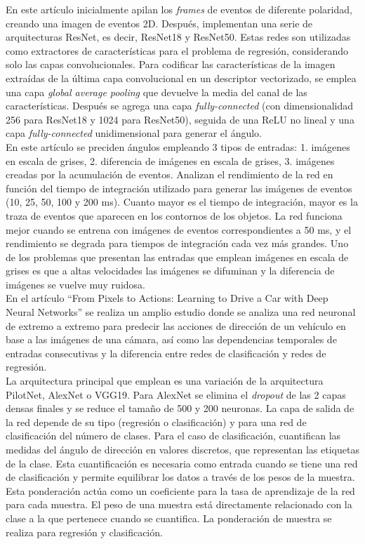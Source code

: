 En este artículo inicialmente apilan los \textit{frames} de eventos de diferente polaridad, creando una imagen de eventos 2D. Después, implementan una serie de arquitecturas ResNet, es decir, ResNet18 y ResNet50. Estas redes son utilizadas como extractores de características para el problema de regresión, considerando solo las capas convolucionales. Para codificar las características de la imagen extraídas de la última capa convolucional en un descriptor vectorizado, se emplea una capa \textit{global average pooling} que devuelve la media del canal de las características. Después se agrega una capa \textit{fully-connected} (con dimensionalidad 256 para ResNet18 y 1024 para ResNet50), seguida de una ReLU no lineal y una capa \textit{fully-connected} unidimensional para generar el ángulo.\\

En este artículo \cite{event} se preciden ángulos empleando 3 tipos de entradas: 1. imágenes en escala de grises, 2. diferencia de imágenes en escala de grises, 3. imágenes creadas por la acumulación de eventos. Analizan el rendimiento de la red en función del tiempo de integración utilizado para generar las imágenes de eventos (10, 25, 50, 100 y 200 ms). Cuanto mayor es el tiempo de integración, mayor es la traza de eventos que aparecen en los contornos de los objetos. La red funciona mejor cuando se entrena con imágenes de eventos correspondientes a 50 ms, y el rendimiento se degrada para tiempos de integración cada vez más grandes. Uno de los problemas que presentan las entradas que emplean imágenes en escala de grises es que a altas velocidades las imágenes se difuminan y la diferencia de imágenes se vuelve muy ruidosa.\\

En el artículo ``From Pixels to Actions: Learning to Drive a Car with Deep Neural Networks'' \cite{pixels} se realiza un amplio estudio donde se analiza una red neuronal de extremo a extremo para predecir las acciones de dirección de un vehículo en base a las imágenes de una cámara, así como las dependencias temporales de entradas consecutivas y la diferencia entre redes de clasificación y redes de regresión.\\

La arquitectura principal que emplean es una variación de la arquitectura PilotNet, AlexNet o VGG19. Para AlexNet se elimina el \textit{dropout} de las 2 capas densas finales y se reduce el tamaño de 500 y 200 neuronas. La capa de salida de la red depende de su tipo (regresión o clasificación) y para una red de clasificación del número de clases. Para el caso de clasificación, cuantifican las medidas del ángulo de dirección en valores discretos, que representan las etiquetas de la clase. Esta cuantificación es necesaria como entrada cuando se tiene una red de clasificación y permite equilibrar los datos a través de los pesos de la muestra. Esta ponderación actúa como un coeficiente para la tasa de aprendizaje de la red para cada muestra. El peso de una muestra está directamente relacionado con la clase a la que pertenece cuando se cuantifica. La ponderación de muestra se realiza para regresión y clasificación.\\

